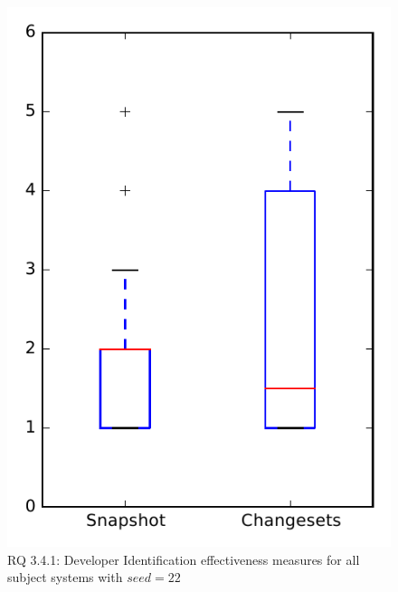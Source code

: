 
\begin{figure}
\centering
\includegraphics[height=0.4\textheight]{figures/dit_seed/rq1_overview_22}
\caption{RQ 3.4.1: Developer Identification effectiveness measures for all subject systems with $seed=22$}
\label{fig:dit_seed:rq1:overview}
\end{figure}
